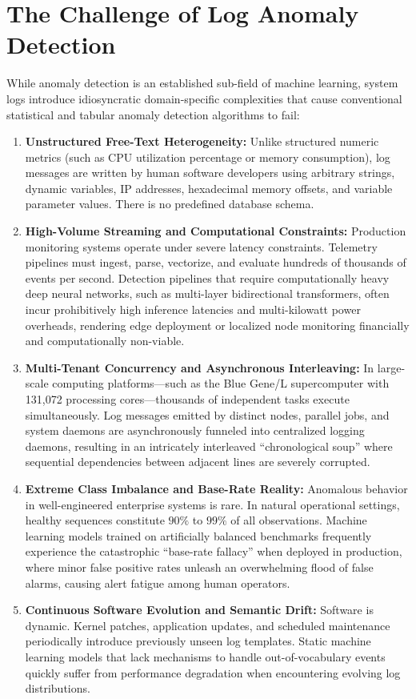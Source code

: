 \section{The Challenge of Log Anomaly Detection}
\label{sec:intro_challenges}
While anomaly detection is an established sub-field of machine learning, system logs introduce idiosyncratic domain-specific complexities that cause conventional statistical and tabular anomaly detection algorithms to fail:

\begin{enumerate}
    \item \textbf{Unstructured Free-Text Heterogeneity:} Unlike structured numeric metrics (such as CPU utilization percentage or memory consumption), log messages are written by human software developers using arbitrary strings, dynamic variables, IP addresses, hexadecimal memory offsets, and variable parameter values. There is no predefined database schema.
    \item \textbf{High-Volume Streaming and Computational Constraints:} Production monitoring systems operate under severe latency constraints. Telemetry pipelines must ingest, parse, vectorize, and evaluate hundreds of thousands of events per second. Detection pipelines that require computationally heavy deep neural networks, such as multi-layer bidirectional transformers, often incur prohibitively high inference latencies and multi-kilowatt power overheads, rendering edge deployment or localized node monitoring financially and computationally non-viable.
    \item \textbf{Multi-Tenant Concurrency and Asynchronous Interleaving:} In large-scale computing platforms—such as the Blue Gene/L supercomputer with 131,072 processing cores—thousands of independent tasks execute simultaneously. Log messages emitted by distinct nodes, parallel jobs, and system daemons are asynchronously funneled into centralized logging daemons, resulting in an intricately interleaved ``chronological soup'' where sequential dependencies between adjacent lines are severely corrupted.
    \item \textbf{Extreme Class Imbalance and Base-Rate Reality:} Anomalous behavior in well-engineered enterprise systems is rare. In natural operational settings, healthy sequences constitute $90\%$ to $99\%$ of all observations. Machine learning models trained on artificially balanced benchmarks frequently experience the catastrophic ``base-rate fallacy'' when deployed in production, where minor false positive rates unleash an overwhelming flood of false alarms, causing alert fatigue among human operators.
    \item \textbf{Continuous Software Evolution and Semantic Drift:} Software is dynamic. Kernel patches, application updates, and scheduled maintenance periodically introduce previously unseen log templates. Static machine learning models that lack mechanisms to handle out-of-vocabulary events quickly suffer from performance degradation when encountering evolving log distributions.
\end{enumerate}

